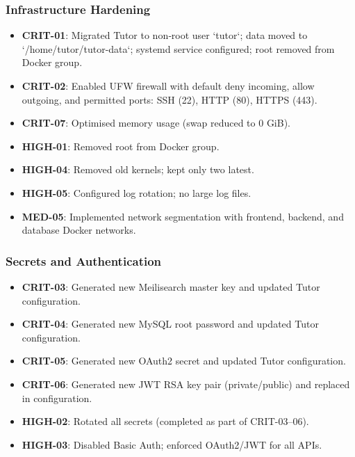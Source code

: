 \subsubsection{Infrastructure Hardening}
\begin{itemize}
    \item \textbf{CRIT-01}: Migrated Tutor to non‑root user `tutor`; data moved to `/home/tutor/tutor-data`; systemd service configured; root removed from Docker group.
    \item \textbf{CRIT-02}: Enabled UFW firewall with default deny incoming, allow outgoing, and permitted ports: SSH (22), HTTP (80), HTTPS (443).
    \item \textbf{CRIT-07}: Optimised memory usage (swap reduced to 0 GiB).
    \item \textbf{HIGH-01}: Removed root from Docker group.
    \item \textbf{HIGH-04}: Removed old kernels; kept only two latest.
    \item \textbf{HIGH-05}: Configured log rotation; no large log files.
    \item \textbf{MED-05}: Implemented network segmentation with frontend, backend, and database Docker networks.
\end{itemize}

\subsubsection{Secrets and Authentication}
\begin{itemize}
    \item \textbf{CRIT-03}: Generated new Meilisearch master key and updated Tutor configuration.
    \item \textbf{CRIT-04}: Generated new MySQL root password and updated Tutor configuration.
    \item \textbf{CRIT-05}: Generated new OAuth2 secret and updated Tutor configuration.
    \item \textbf{CRIT-06}: Generated new JWT RSA key pair (private/public) and replaced in configuration.
    \item \textbf{HIGH-02}: Rotated all secrets (completed as part of CRIT-03–06).
    \item \textbf{HIGH-03}: Disabled Basic Auth; enforced OAuth2/JWT for all APIs.
\end{itemize}

